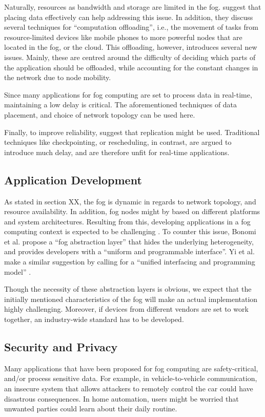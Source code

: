 \documentclass{article}
\begin{document}
Naturally, resources as bandwidth and storage are limited in the fog. \cite{yi2015survey} suggest that placing data effectively can help addressing this issue. In addition, they discuss several techniques for ``computation offloading'', i.e., the movement of tasks from resource-limited devices like mobile phones to more powerful nodes that are located in the fog, or the cloud. This offloading, however, introduces several new issues. Mainly, these are centred around the difficulty of deciding which parts of the application should be offloaded, while accounting for the constant changes in the network due to node mobility.

Since many applications for fog computing are set to process data in real-time, maintaining a low delay is critical. The aforementioned techniques of data placement, and choice of network topology can be used here.

Finally, to improve reliability, \cite{yi2015survey} suggest that replication might be used. Traditional techniques like checkpointing, or rescheduling, in contrast, are argued to introduce much delay, and are therefore unfit for real-time applications.

\subsection{Application Development}
As stated in section XX, the fog is dynamic in regards to network topology, and resource availability. In addition, fog nodes might by based on different platforms and system architectures. Resulting from this, developing applications in a fog computing context is expected to be challenging \cite{yi2015survey}. To counter this issue, Bonomi et al. \cite{bonomi2014fog} propose a ``fog abstraction layer'' that hides the underlying heterogeneity, and provides developers with a ``uniform and programmable interface''. Yi et al. make a similar suggestion by calling for a ``unified interfacing and programming model'' \cite{yi2015survey}.

Though the necessity of these abstraction layers is obvious, we expect that the initially mentioned characteristics of the fog will make an actual implementation highly challenging. Moreover, if devices from different vendors are set to work together, an industry-wide standard has to be developed.

\subsection{Security and Privacy}
Many applications that have been proposed for fog computing are safety-critical, and/or process sensitive data. For example, in vehicle-to-vehicle communication, an insecure system that allows attackers to remotely control the car could have disastrous consequences. In home automation, users might be worried that unwanted parties could learn about their daily routine.
\end{document}
